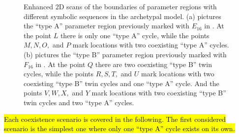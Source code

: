 \begin{figure}
	\centering
	\caption[Enhanced 2D scans of the boundaries of parameter regions with different symbolic sequences in the archetypal model]{
		Enhanced 2D scans of the boundaries of parameter regions with different symbolic sequences in the archetypal model.
		(a) pictures the ``type A'' parameter region previously marked with $E_{16}$ in .
		At the point $L$ there is only one ``type A'' cycle, while the points $M, N, O,$ and $P$ mark locations with two coexisting ``type A'' cycles.
		(b) pictures the ``type B'' parameter region previously marked with $F_{16}$ in .
		At the point $Q$ there are two coexisting ``type B'' twin cycles, while the points $R, S, T,$ and $U$ mark locations with two coexisting ``type B'' twin cycles and one ``type A'' cycle.
		And the points $V, W, X,$ and $Y$ mark locations with two coexisting ``type B'' twin cycles and two ``type A'' cycles.
	}
	\label{fig:arch.coex.regions}
\end{figure}

\hl{
	Each coexistence scenario is covered in the following.
	The first considered scenario is the simplest one where only one ``type A'' cycle exists on its own.
}


